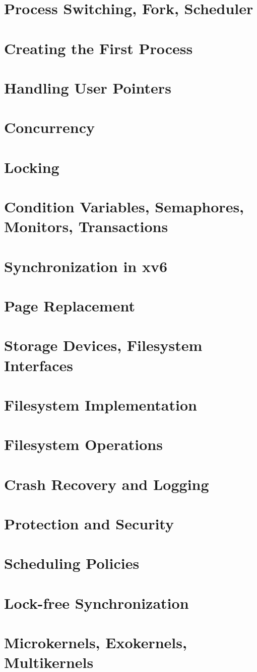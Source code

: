 \section{Process Switching, Fork, Scheduler}
\section{Creating the First Process}
\section{Handling User Pointers}
\section{Concurrency}
\section{Locking}
\section{Condition Variables, Semaphores, Monitors, Transactions}
\section{Synchronization in xv6}
\section{Page Replacement}
\section{Storage Devices, Filesystem Interfaces}
\section{Filesystem Implementation}
\section{Filesystem Operations}
\section{Crash Recovery and Logging}
\section{Protection and Security}
\section{Scheduling Policies}
\section{Lock-free Synchronization}
\section{Microkernels, Exokernels, Multikernels}


